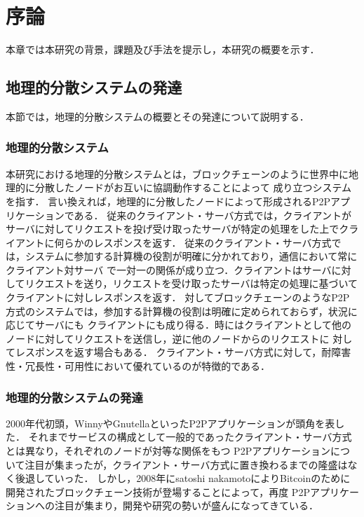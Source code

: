 \chapter{序論}
\label{introduction}

本章では本研究の背景，課題及び手法を提示し，本研究の概要を示す．

\section{地理的分散システムの発達}
\label{introduction:system-growth}
本節では，地理的分散システムの概要とその発達について説明する．

\subsection{地理的分散システム}
本研究における地理的分散システムとは，ブロックチェーンのように世界中に地理的に分散したノードがお互いに協調動作することによって
成り立つシステムを指す．
言い換えれば，地理的に分散したノードによって形成されるP2Pアプリケーションである．
従来のクライアント・サーバ方式では，クライアントがサーバに対してリクエストを投げ受け取ったサーバが特定の処理をした上でクライアントに何らかのレスポンスを返す．
従来のクライアント・サーバ方式では，システムに参加する計算機の役割が明確に分かれており，通信において常にクライアント対サーバ
で一対一の関係が成り立つ．クライアントはサーバに対してリクエストを送り，リクエストを受け取ったサーバは特定の処理に基づいて
クライアントに対しレスポンスを返す．
対してブロックチェーンのようなP2P方式のシステムでは，参加する計算機の役割は明確に定められておらず，状況に応じてサーバにも
クライアントにも成り得る．時にはクライアントとして他のノードに対してリクエストを送信し，逆に他のノードからのリクエストに
対してレスポンスを返す場合もある．
クライアント・サーバ方式に対して，耐障害性・冗長性・可用性において優れているのが特徴的である．

\subsection{地理的分散システムの発達}
2000年代初頭，WinnyやGnutellaといったP2Pアプリケーションが頭角を表した．
それまでサービスの構成として一般的であったクライアント・サーバ方式とは異なり，それぞれのノードが対等な関係をもつ
P2Pアプリケーションについて注目が集まったが，クライアント・サーバ方式に置き換わるまでの隆盛はなく後退していった．
しかし，2008年にsatoshi nakamotoによりBitcoinのために開発されたブロックチェーン技術が登場することによって，再度
P2Pアプリケーションへの注目が集まり，開発や研究の勢いが盛んになってきている．


